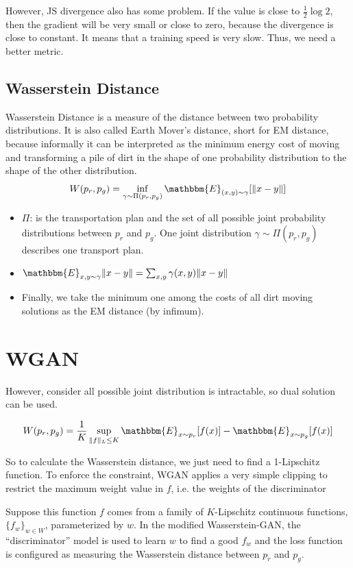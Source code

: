 However, JS divergence also has some problem. If the value is close to $\frac{1}{2}\log 2$, then the gradient will be very small or close to zero, because the divergence is close to constant. It means that a training speed is very slow. Thus, we need a better metric. 

\subsection{Wasserstein Distance}
Wasserstein Distance is a measure of the distance between two probability distributions. It is also called Earth Mover’s distance, short for EM distance, because informally it can be interpreted as the minimum energy cost of moving and transforming a pile of dirt in the shape of one probability distribution to the shape of the other distribution.
\begin{equation*}
	W(p_r, p_g) = \inf_{\gamma \sim \Pi(p_r, p_g)} \mathbbm{E}_{(x, y) \sim \gamma}[\| x-y \|]
\end{equation*}

\begin{itemize}
	\item $\Pi$: is the transportation plan and the set of all possible joint probability distributions between $p_r$ and $p_g$. One joint distribution $\gamma \sim \Pi(p_r, p_g)$ describes one transport plan.\
	\item $\mathbbm{E}_{x, y \sim \gamma} \| x-y \| = \sum_{x, y} \gamma(x, y) \| x-y \|$
	\item Finally, we take the minimum one among the costs of all dirt moving solutions as the EM distance (by infimum). 
\end{itemize}

\section{WGAN}
However, consider all possible joint distribution is intractable, so dual solution can be used. 

$$W(p_r, p_g) = \frac{1}{K} \sup_{\| f \|_L \leq K} \mathbbm{E}_{x \sim p_r}[f(x)] - \mathbbm{E}_{x \sim p_g}[f(x)]$$

So to calculate the Wasserstein distance, we just need to find a 1-Lipschitz function. To enforce the constraint, WGAN applies a very simple clipping to restrict the maximum weight value in $f$, i.e. the weights of the discriminator

Suppose this function $f$ comes from a family of $K$-Lipschitz continuous functions, $\{f_w\}_{w\in W}$, parameterized by $w$. In the modified Wasserstein-GAN, the ``discriminator'' model is used to learn $w$ to find a good $f_w$ and the loss function is configured as measuring the Wasserstein distance between $p_r$ and $p_g$.

